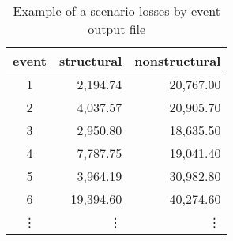 \begin{table}[htbp]
\centering
\begin{tabular}{crr}

\hline
\rowcolor{lightgray}
\bf{event} & \bf{structural} & \bf{nonstructural} \\
\hline
1     & 2,194.74   & 20,767.00     \\
2     & 4,037.57   & 20,905.70     \\
3     & 2,950.80   & 18,635.50     \\
4     & 7,787.75   & 19,041.40     \\
5     & 3,964.19   & 30,982.80     \\
6     & 19,394.60  & 40,274.60     \\
⋮     & ⋮          & ⋮             \\
\hline

\end{tabular}
\caption{Example of a scenario losses by event output file}
\label{output:scenario_loss_event}
\end{table}